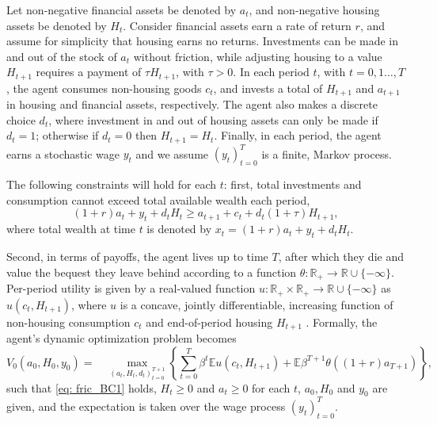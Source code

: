 \documentclass[12pt]{article}
\begin{document}
Let non-negative financial assets be denoted by $a_{t}$, and non-negative housing assets be denoted by $H_{t}$. Consider financial assets earn a rate of return $r$, and assume for simplicity that housing earns no returns. Investments can be made in and out of the stock of $a_{t}$ without friction, while adjusting housing to a value $H_{t+1}$ requires a payment of $\tau H_{t+1}$, with $\tau>0$. In each period $t$, with $t= 0, 1\dots, T$, the agent consumes non-housing goods $c_{t}$, and invests a total of $H_{t+1}$ and $a_{t+1}$ in housing and financial assets, respectively. The agent also makes a discrete choice $d_{t}$, where investment in and out of housing assets can only be made if $d_{t} = 1$; otherwise if $d_{t}=0$ then $H_{t+1} = H_{t}$. Finally, in each period, the agent earns a stochastic wage $y_{t}$ and we assume  $(y_{t})_{t=0}^{T}$ is a finite, Markov process. 

The following constraints will hold for each $t$: first, total investments and consumption cannot exceed total available wealth each period,
%
\begin{equation}\label{eq: fric_BC1}
    (1+r)a_{t} + y_{t} +  d_{t}H_{t}  \geq a_{t+1} + c_{t} + d_{t}(1+\tau)H_{t+1},
\end{equation}
%
where total wealth at time $t$ is denoted by $x_{t} =  (1+r)a_{t} + y_{t} +  d_{t}H_{t}$.

Second, in terms of payoffs, the agent lives up to time $T$, after which they die and value the bequest they leave behind according to a function $\theta \colon \mathbb{R}_{+} \rightarrow \mathbb{R}\cup\{-\infty\}$.  Per-period utility is given by a real-valued function $u \colon \mathbb{R}_{+}\times \mathbb{R}_{+}\rightarrow \mathbb{R}\cup\{-\infty\}$ as $u(c_{t}, H_{t+1})$, where $u$ is a concave, jointly differentiable, increasing function of non-housing consumption $c_{t}$ and end-of-period housing $H_{t+1}$ \citep{Yogo2016a}. Formally, the agent's dynamic optimization problem becomes
\begin{equation}\label{eq: seq_val}
   V_{0}(a_{0}, H_{0}, y_{0}) = \quad \max_{(a_{t},H_{t}, d_{t})_{t=0}^{T+1}}\left\{ \sum_{t=0}^{T} \beta^{t}\mathbb{E}u(c_{t}, H_{t+1}) + \mathbb{E}\beta^{T+1}\theta((1+r)a_{T+1})\right\},
\end{equation}
%
%
such that \eqref{eq: fric_BC1} holds, $H_{t}\geq 0$ and $a_{t}\geq 0$ for each $t$, $a_{0}, H_{0}$ and $y_{0}$ are given, and the expectation is taken over the wage process $(y_{t})_{t=0}^{T}$. 
\end{document}
